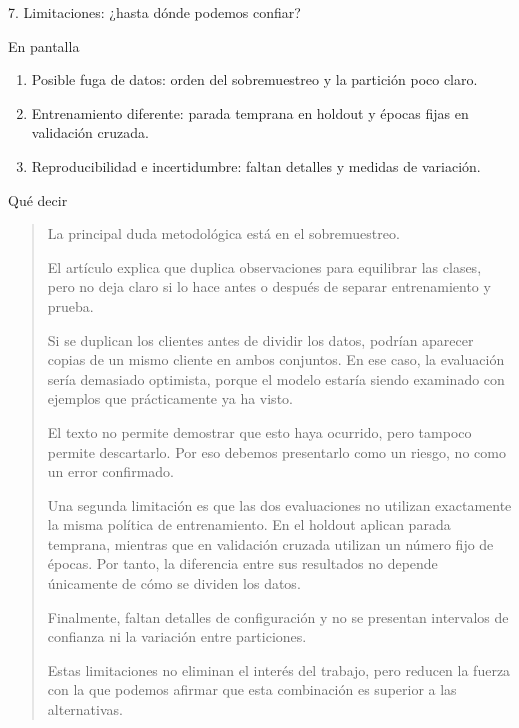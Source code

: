 \documentclass[presentation]{beamer}
\begin{document}
\begin{frame}[label={sec:orgf0e0151}]{7. Limitaciones: ¿hasta dónde podemos confiar?}
\begin{block}{En pantalla}
\begin{enumerate}
\item Posible fuga de datos: orden del sobremuestreo y la partición poco claro.
\item Entrenamiento diferente: parada temprana en holdout y épocas fijas en validación cruzada.
\item Reproducibilidad e incertidumbre: faltan detalles y medidas de variación.
\end{enumerate}
\end{block}
\begin{block}{Qué decir}
\begin{quote}
La principal duda metodológica está en el sobremuestreo.

El artículo explica que duplica observaciones para equilibrar las clases, pero no deja claro si lo hace antes o después de separar entrenamiento y prueba.

Si se duplican los clientes antes de dividir los datos, podrían aparecer copias de un mismo cliente en ambos conjuntos. En ese caso, la evaluación sería demasiado optimista, porque el modelo estaría siendo examinado con ejemplos que prácticamente ya ha visto.

El texto no permite demostrar que esto haya ocurrido, pero tampoco permite descartarlo. Por eso debemos presentarlo como un riesgo, no como un error confirmado.

Una segunda limitación es que las dos evaluaciones no utilizan exactamente la misma política de entrenamiento. En el holdout aplican parada temprana, mientras que en validación cruzada utilizan un número fijo de épocas. Por tanto, la diferencia entre sus resultados no depende únicamente de cómo se dividen los datos.

Finalmente, faltan detalles de configuración y no se presentan intervalos de confianza ni la variación entre particiones.

Estas limitaciones no eliminan el interés del trabajo, pero reducen la fuerza con la que podemos afirmar que esta combinación es superior a las alternativas.
\end{quote}
\end{block}
\end{frame}
\end{document}
